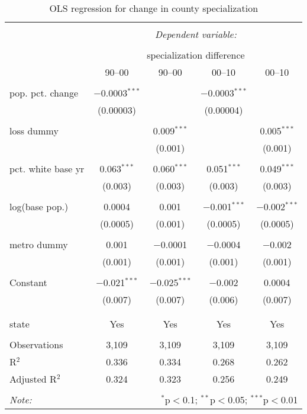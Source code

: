 
\begin{table}[p] \centering 
  \caption{OLS regression for change in county specialization} 
  \label{} 
\begin{tabular}{@{\extracolsep{5pt}}lcccc} 
\\[-1.8ex]\hline 
\hline \\[-1.8ex] 
 & \multicolumn{4}{c}{\textit{Dependent variable:}} \\ 
\cline{2-5} 
\\[-1.8ex] & \multicolumn{4}{c}{specialization difference} \\ 
 & 90--00 & 90--00 & 00--10 & 00--10 \\ 
\hline \\[-1.8ex] 
 pop. pct. change & $-$0.0003$^{***}$ &  & $-$0.0003$^{***}$ &  \\ 
  & (0.00003) &  & (0.00004) &  \\ 
  & & & & \\ 
 loss dummy &  & 0.009$^{***}$ &  & 0.005$^{***}$ \\ 
  &  & (0.001) &  & (0.001) \\ 
  & & & & \\ 
 pct. white base yr & 0.063$^{***}$ & 0.060$^{***}$ & 0.051$^{***}$ & 0.049$^{***}$ \\ 
  & (0.003) & (0.003) & (0.003) & (0.003) \\ 
  & & & & \\ 
 log(base pop.) & 0.0004 & 0.001 & $-$0.001$^{***}$ & $-$0.002$^{***}$ \\ 
  & (0.0005) & (0.001) & (0.0005) & (0.0005) \\ 
  & & & & \\ 
 metro dummy & 0.001 & $-$0.0001 & $-$0.0004 & $-$0.002 \\ 
  & (0.001) & (0.001) & (0.001) & (0.001) \\ 
  & & & & \\ 
 Constant & $-$0.021$^{***}$ & $-$0.025$^{***}$ & $-$0.002 & 0.0004 \\ 
  & (0.007) & (0.007) & (0.006) & (0.007) \\ 
  & & & & \\ 
\hline \\[-1.8ex] 
state & Yes & Yes & Yes & Yes \\ 
\hline \\[-1.8ex] 
Observations & 3,109 & 3,109 & 3,109 & 3,109 \\ 
R$^{2}$ & 0.336 & 0.334 & 0.268 & 0.262 \\ 
Adjusted R$^{2}$ & 0.324 & 0.323 & 0.256 & 0.249 \\ 
\hline 
\hline \\[-1.8ex] 
\textit{Note:}  & \multicolumn{4}{r}{$^{*}$p$<$0.1; $^{**}$p$<$0.05; $^{***}$p$<$0.01} \\ 
\end{tabular} 
\end{table} 
